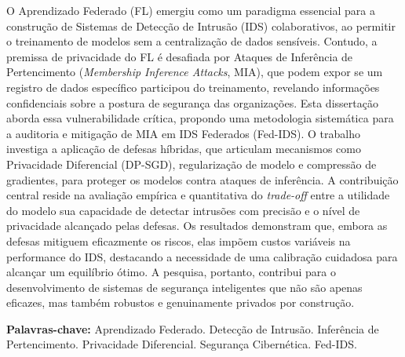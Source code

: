 \documentclass[
	12pt,				%
	openright,			%
	oneside,			%
	a4paper,			%
	english,			%
	french,				%
	spanish,			%
	brazil,				%
	]{abntex2}
\begin{document}

\setlength{\absparsep}{18pt} %
\begin{resumo}
O Aprendizado Federado (FL) emergiu como um paradigma essencial para a construção de Sistemas de Detecção de Intrusão (IDS) colaborativos, ao permitir o treinamento de modelos sem a centralização de dados sensíveis. Contudo, a premissa de privacidade do FL é desafiada por Ataques de Inferência de Pertencimento (\textit{Membership Inference Attacks}, MIA), que podem expor se um registro de dados específico participou do treinamento, revelando informações confidenciais sobre a postura de segurança das organizações. Esta dissertação aborda essa vulnerabilidade crítica, propondo uma metodologia sistemática para a auditoria e mitigação de MIA em IDS Federados (Fed-IDS). O trabalho investiga a aplicação de defesas híbridas, que articulam mecanismos como Privacidade Diferencial (DP-SGD), regularização de modelo e compressão de gradientes, para proteger os modelos contra ataques de inferência. A contribuição central reside na avaliação empírica e quantitativa do \textit{trade-off} entre a utilidade do modelo sua capacidade de detectar intrusões com precisão e o nível de privacidade alcançado pelas defesas. Os resultados demonstram que, embora as defesas mitiguem eficazmente os riscos, elas impõem custos variáveis na performance do IDS, destacando a necessidade de uma calibração cuidadosa para alcançar um equilíbrio ótimo. A pesquisa, portanto, contribui para o desenvolvimento de sistemas de segurança inteligentes que não são apenas eficazes, mas também robustos e genuinamente privados por construção.

\textbf{Palavras-chave:} Aprendizado Federado. Detecção de Intrusão. Inferência de Pertencimento. Privacidade Diferencial. Segurança Cibernética. Fed-IDS.
\end{resumo}
\end{document}
